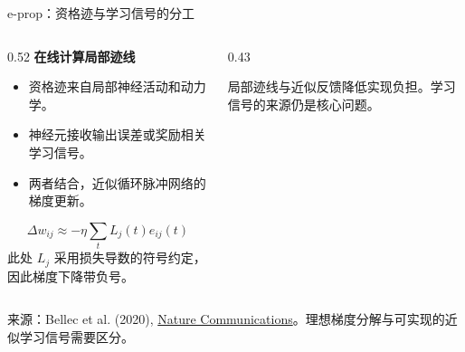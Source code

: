 \documentclass[UTF8,aspectratio=169,10pt,fontset=fandol]{ctexbeamer}
\newcommand{\source}[1]{\par\vfill{\tiny\color{Muted}来源：#1}}
\newcommand{\paper}[2]{\href{#1}{#2}}
\begin{document}
\begin{frame}{e-prop：资格迹与学习信号的分工}
  \begin{columns}[T,onlytextwidth]
    \begin{column}{0.52\textwidth}
      \textbf{在线计算局部迹线}
      \begin{itemize}
        \item 资格迹来自局部神经活动和动力学。
        \item 神经元接收输出误差或奖励相关学习信号。
        \item 两者结合，近似循环脉冲网络的梯度更新。
      \end{itemize}
      \[
        \Delta w_{ij}\approx-\eta\sum_t L_j(t)e_{ij}(t)
      \]
      {\small 此处 $L_j$ 采用损失导数的符号约定，因此梯度下降带负号。}
    \end{column}
    \begin{column}{0.43\textwidth}
      \centering
      \medskip

      {\small\alert{局部迹线与近似反馈降低实现负担。学习信号的来源仍是核心问题。}}
    \end{column}
  \end{columns}
  \source{Bellec et al. (2020), \paper{https://www.nature.com/articles/s41467-020-17236-y}{Nature Communications}。理想梯度分解与可实现的近似学习信号需要区分。}
\end{frame}
\end{document}
